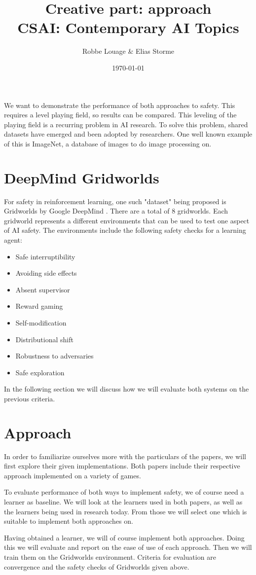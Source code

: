\documentclass[a4paper,kul]{kulakarticle}
\begin{document}
\title{}
\title{Creative part: approach\\CSAI: Contemporary AI Topics}
\author{Robbe Louage \& Elias Storme}
\date{\today}
\maketitle
\vspace{1.5em}

We want to demonstrate the performance of both approaches to safety. This requires a level 
playing field, so results can be compared. This leveling of the playing field is a recurring 
problem in AI research. To solve this problem, shared datasets have emerged and been adopted by researchers. One well known example of this is ImageNet, a database of images to do image processing on.
\section{DeepMind Gridworlds}
For safety in reinforcement learning, one such "dataset" being proposed is 
Gridworlds by Google DeepMind \cite{leike2017ai}. There are a total of 8 
gridworlds. Each gridworld represents a different environments that can be used to test one aspect of AI safety.
The environments include the following safety checks for a learning agent: 
\begin{multicols}{2}
\begin{itemize}
	\setlength\itemsep{0.25em}
	\item Safe interruptibility
	\item Avoiding side effects
	\item Absent supervisor
	\item Reward gaming
	\item Self-modification
	\item Distributional shift
	\item Robustness to adversaries
	\item Safe exploration
\end{itemize}
\end{multicols}
In the following section we will discuss how we will evaluate both systems on 
the previous criteria.

\section{Approach}
In order to familiarize ourselves more with the particulars of the papers, we will first explore their given implementations. Both papers include their respective approach implemented on a variety of games.
\par To evaluate performance of both ways to implement safety, we of course need a learner as baseline. We will look at the learners used in both papers, as well as the learners being used in research today. From those we will select one which is suitable to implement both approaches on.
\par Having obtained a learner, we will of course implement both approaches. Doing this we will evaluate and report on the ease of use of each approach. Then we will train them on the Gridworlds environment. Criteria for evaluation are convergence and the safety checks of Gridworlds given above.



\end{document}
